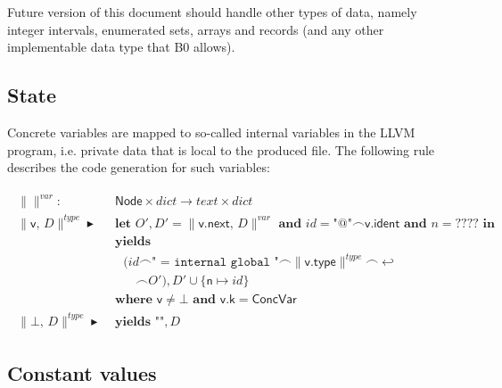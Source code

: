 \documentclass{article}
\newcommand{\trad}[2]{\ensuremath{\lVert \textsf{#1} \rVert^{\textit{#2}}}}
\newcommand{\nl}[0]{\ensuremath{\hookleftarrow}}
\DeclareMathOperator{\conc}{\smallfrown}
\DeclareMathOperator{\isdef}{\blacktriangleright}
\DeclareMathOperator{\name}{\mathcal{L}()}
\begin{document}
Future version of this document should handle other types of data,
namely integer intervals, enumerated sets, arrays and records (and
any other implementable data type that B0 allows).

\subsection{State}
\label{sec:state}

Concrete variables are mapped to so-called internal variables in the
LLVM program, i.e. private data that is local to the produced
file. The following rule describes the code generation for such
variables:

\begin{framed}
\begin{align}
\begin{split}
  \trad{}{var} : & \textsf{ Node} \times dict \rightarrow text \times dict \\
  \trad{v, $D$}{type} \isdef & \textbf{ let } O', D' = \trad{v.next, $D$}{var} \textbf{ and } 
  id = \texttt{"@"} \conc \textsf{v.ident}  \textbf{ and }  n = ???? \textbf{ in} \\
  & \textbf{ yields } \\
  & \quad (id \conc \texttt{" = internal global "} \conc \trad{v.type}{type} \conc \nl \\
  & \quad \quad \conc O'), D' \cup \{ \textsf{n} \mapsto id \} \\
  & \textbf{ where } \textsf{v} \ne \bot \textbf{ and } \textsf{v.k} = \textsf{ConcVar} \\
  \trad{$\bot$, $D$}{type} \isdef & \textbf{ yields } \texttt{""}, D
\end{split}
\end{align}
\end{framed}

\subsection{Constant values}
\label{sec:values}
\end{document}
